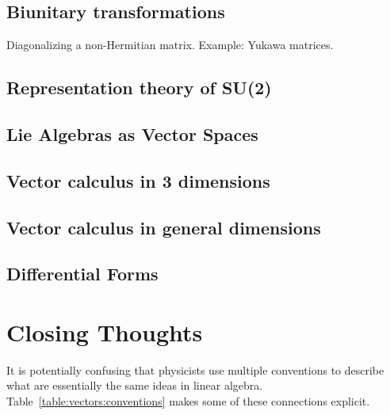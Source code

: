 \section{Biunitary transformations}
Diagonalizing a non-Hermitian matrix. Example: Yukawa matrices.


\section{Representation theory of SU(2)}
\section{Lie Algebras as Vector Spaces}
\section{Vector calculus in 3 dimensions}
\section{Vector calculus in general dimensions}
\section{Differential Forms}


\chapter*{Closing Thoughts}


It is potentially confusing that physicists use multiple conventions to describe what are essentially the same ideas in linear algebra. Table~\ref{table:vectors:conventions} makes some of these connections explicit.

